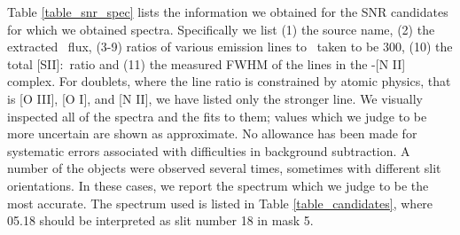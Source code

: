   


Table \ref{table_snr_spec}  lists the information we obtained for the SNR candidates for which we obtained spectra.    Specifically we list (1) the source name, (2) the extracted  \ha\ flux, (3-9) ratios of various emission lines to \ha\ taken to be 300, (10) the total [SII]:\ha\ ratio and (11) the measured FWHM of the lines in the \ha-[N II] complex.  For doublets, where the line ratio is constrained by atomic physics, that is [O III], [O I], and [N II], we have listed only the stronger line.  We visually inspected all of the spectra and the fits to them; values which we judge to be more uncertain are shown as approximate.  No allowance has been made for systematic errors associated with difficulties in background subtraction.  A number of the objects were observed several times, sometimes with different slit orientations.  In these cases, we report the spectrum which we judge to be the most accurate.  The spectrum used is listed in Table \ref{table_candidates}, where 05.18 should be interpreted as slit number 18 in mask 5.



